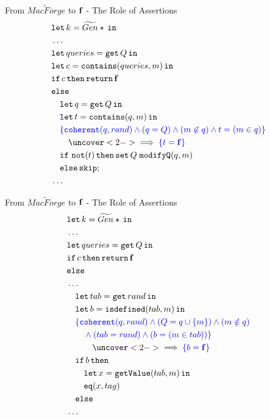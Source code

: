 \documentclass{beamer}[aspectratio=169]
\begin{document}
\begin{frame}{From \texorpdfstring{$\widetilde{MacForge}$}{MacForge} to \texorpdfstring{$\mathbf{f}$}{false} - The Role of Assertions}
    \footnotesize
    \begin{align*}
        &\letin{k = \widetilde{Gen} \star}{} \\
        &\dots \\
        &\letin{queries = \get Q}{} \\
        &\letin{c=\mathtt{contains}(queries, m)}{} \\
        & \mathtt{if}\, c\, \mathtt{then}\, \return \false\\
        &\mathtt{else} \\
        &\quad\letin{q=\get Q}{} \\
        &\quad\letin{t=\mathtt{contains}(q,m)}{} \\
        &\quad \color{blue} \{ \mathtt{coherent}(q, rand) \land (q=Q) \land (m \not\in q) \land t = (m \in q)\} \\
        &\qquad \uncover<2->{\implies \color{blue} \{  t = \false \}} \\
        &\quad \mathtt{if}\ \mathtt{not}(t)\,\mathtt{then}\,\mathtt{set}\,Q\;\mathtt{modifyQ}(q, m) \\
        &\quad \mathtt{else}\,\mathtt{skip}; \\
        &\dots
    \end{align*}
\end{frame}

\begin{frame}{From \texorpdfstring{$\widetilde{MacForge}$}{MacForge} to \texorpdfstring{$\mathbf{f}$}{false} - The Role of Assertions}
    \footnotesize
    \begin{align*}
    &\letin{k = \widetilde{Gen} \star}{} \\
    &\dots \\
    &\letin{queries = \get Q}{} \\
    & \mathtt{if}\, c\, \mathtt{then}\, \return \false\\
    &\mathtt{else} \\
    &\dots \\
    &\quad\letin{tab = \mathtt{get}\,rand}{} \\
    &\quad\letin{b = \mathtt{isdefined}(tab, m)}{} \\
    &\quad \color{blue} \{ \mathtt{coherent}(q, rand) \land (Q = q \cup \{m\}) \land (m \notin q) \\
    &\qquad \color{blue} \land (tab=rand) \land (b=(m \in tab)) \} \\
    &\qquad\quad \uncover<2->{\implies \color{blue} \{ b = \false \}} \\
    &\quad\mathtt{if}\, b\, \mathtt{then} \\
    &\quad\quad \letin{x = \mathtt{getValue}(tab, m)}{} \\
    &\quad\quad \mathtt{eq}(x,tag) \\
    &\quad\mathtt{else} \\
    &\dots
    \end{align*}
\end{frame}
\end{document}

